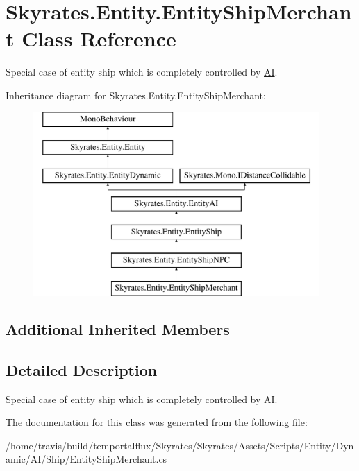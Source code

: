 \hypertarget{class_skyrates_1_1_entity_1_1_entity_ship_merchant}{\section{Skyrates.\-Entity.\-Entity\-Ship\-Merchant Class Reference}
\label{class_skyrates_1_1_entity_1_1_entity_ship_merchant}
}


Special case of entity ship which is completely controlled by \hyperlink{namespace_skyrates_1_1_a_i}{A\-I}.  


Inheritance diagram for Skyrates.\-Entity.\-Entity\-Ship\-Merchant\-:\begin{figure}[H]
\begin{center}
\leavevmode
\includegraphics[height=7.000000cm]{class_skyrates_1_1_entity_1_1_entity_ship_merchant}
\end{center}
\end{figure}
\subsection*{Additional Inherited Members}


\subsection{Detailed Description}
Special case of entity ship which is completely controlled by \hyperlink{namespace_skyrates_1_1_a_i}{A\-I}. 



The documentation for this class was generated from the following file\-:\begin{DoxyCompactItemize}
\item 
/home/travis/build/temportalflux/\-Skyrates/\-Skyrates/\-Assets/\-Scripts/\-Entity/\-Dynamic/\-A\-I/\-Ship/Entity\-Ship\-Merchant.\-cs\end{DoxyCompactItemize}
